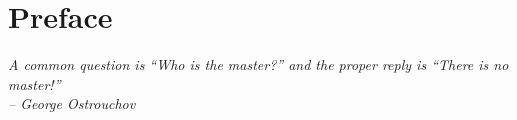 \chapter*{Preface}

{\it
A common
question is ``Who is the master?'' and the proper reply is ``There is
no master!'' \\
\--- George Ostrouchov
}


\vfill
